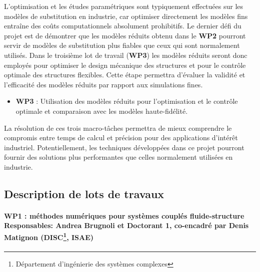 \documentclass[12pt, french]{article}
\begin{document}
L'optimisation et les études paramétriques sont typiquement effectuées sur les
modèles de substitution en industrie, car optimiser directement les modèles fins entraîne des coûts computationnels absolument prohibitifs. Le dernier défi du projet est de démontrer que les modèles réduits obtenu dans le \textbf{WP2} pourront servir de modèles de substitution plus fiables que ceux qui sont normalement utilisés. Dans le troisième lot de travail (\textbf{WP3}) les modèles réduits seront donc employés pour optimiser le design mécanique des structures et pour le contrôle optimale des structures flexibles. Cette étape permettra d’évaluer la validité et l’efficacité des modèles réduits par rapport aux simulations fines. 
	\begin{itemize}
		\item \textbf{WP3} : Utilisation des modèles réduits pour l'optimisation et le contrôle optimale et comparaison avec les  modèles haute-fidélité.
	\end{itemize}
	
La résolution de ces trois macro-tâches permettra de mieux comprendre le compromis entre temps de calcul et précision pour des applications d'intérêt industriel. Potentiellement, les techniques développées dans ce projet pourront fournir des solutions plus performantes que celles normalement utilisées en industrie. 

\newpage
\subsection{Description de lots de travaux}
	
	
	\paragraph[\large WP1 : méthodes numériques pour systèmes couplés fluide-structure\\
	Responsables: Andrea Brugnoli et Doctorant 1, co-encadré par Denis Matignon (DISC, ISAE)]{\large WP1 : méthodes numériques pour systèmes couplés fluide-structure\\
		Responsables: Andrea Brugnoli et Doctorant 1, co-encadré par Denis Matignon (DISC\footnote{Département d’ingénierie des systèmes complexes}, ISAE)\\}
	
\end{document}
